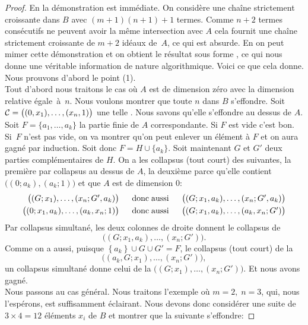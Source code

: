 \begin{proof}
En \clama la démonstration est immédiate. On considère une chaîne 
strictement croissante dans $B$ avec $(m+1)(n+1)+1$ termes. Comme $n+2$ 
termes consécutifs ne peuvent avoir la même intersection avec $A$ cela 
fournit une chaîne strictement croissante de $m+2$ idéaux de~$A$, 
ce qui est absurde. En \coma on peut mimer cette démonstration et on obtient le 
résultat sous forme \cov, ce qui nous donne une véritable information 
de nature algorithmique. Voici ce que cela donne.\\
Nous prouvons d'abord le point (1).\\
Tout d'abord nous traitons le cas où $A$ est de dimension zéro avec la 
dimension relative égale~à~$n$. Nous voulons montrer que toute 
\proelo$n$ dans $B$ s'effondre. Soit~\hbox{${\cal C}=\big((0,x_1),\ldots,(x_n,1)\big)$} une telle 
\proel. Nous savons qu'elle s'effondre au dessus de $A$. 
Soit $F=\{a_1,\ldots,a_k\}$ la partie finie de $A$ correspondante. Si $F$  
est vide c'est bon. Si~$F$ n'est pas vide, on va montrer qu'on peut 
enlever un élément à $F$ et on aura gagné par induction. 
Soit donc $F=H\cup \{a_k\}$. Soit maintenant $G$  et $G'$  deux parties  
complémentaires de $H$. On a les collapsus (tout court) des \procs 
suivantes, la première par collapsus au dessus de $A$, la deuxième 
parce qu'elle contient $\big((0;a_k),(a_k;1)\big)$ et que $A$  est de dimension 
$0$:
$$\begin{array}{rcl} 
\big((G;x_1),\ldots,(x_n;G',a_k)\big) &\; \; {\rm donc\; aussi}\; \; &  
\big((G;x_1,a_k),\ldots,(x_n;G',a_k)\big)\\[.3em] 
\big((0;x_1,a_k),\ldots,(a_k,x_n;1)\big) &\; \; {\rm donc\; aussi}\; \; &  
\big((G;x_1,a_k),\ldots,(a_k,x_n;G')\big) 
\end{array}$$
Par collapsus simultané, les deux colonnes de droite donnent le 
collapsus de
$$\big((G;x_1,a_k),\ldots,(x_n;G')\big).$$
Comme on a aussi, 
puisque $\left\{a_k \right\}\cup G\cup G'=F $,
le collapsus (tout court) de la \proc $$\big((a_k,G;x_1),\ldots,(x_n;G')\big),$$ un
collapsus simultané donne celui de la \proc $\big((G;x_1),\ldots,(x_n;G')\big)$. 
Et nous avons gagné.
\\
Nous passons au cas général. Nous traitons l'exemple où $m=2,\; 
n=3$, qui, nous l'espérons, est suffisamment éclairant. Nous devons 
donc considérer une suite de $3\times 4=12$ éléments $x_i$ de $B$ et 
montrer que  la \proel suivante s'effondre:

\end{proof}
